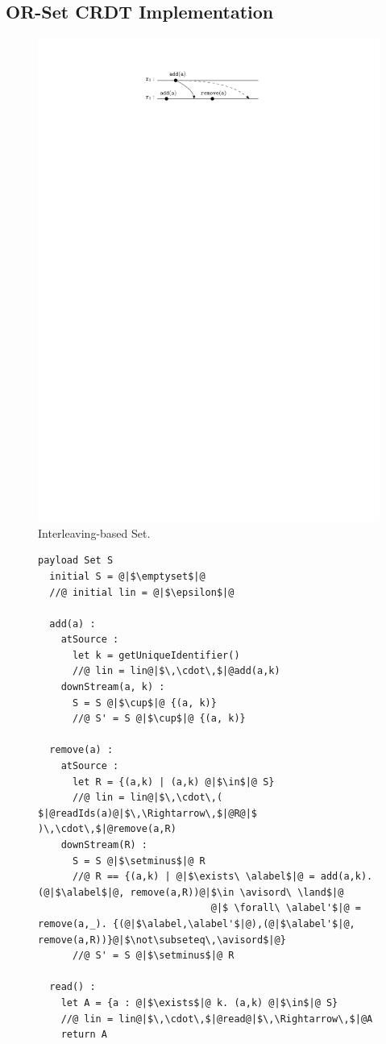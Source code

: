 

\subsection{OR-Set CRDT Implementation}
\label{sec:or-set-crdt}
\begin{figure}
  \centering
  \includegraphics[width=0.35 \textwidth]{./figures/OR-Set-simple}
  \vspace{-5pt}
  \caption{Interleaving-based Set.}
  \vspace{-5pt}
  \label{fig:or-set-simple}
\end{figure}

\begin{figure}[!t]
  \centering
\begin{lstlisting}[caption={Pseudo-code of the OR-Set CRDT.},basicstyle=\ttfamily\scriptsize,captionpos=b,label={lst:or-set}]
  payload Set S
  initial S = @|$\emptyset$|@
  //@ initial lin = @|$\epsilon$|@

  add(a) :
    atSource :
      let k = getUniqueIdentifier()
      //@ lin = lin@|$\,\cdot\,$|@add(a,k)
    downStream(a, k) :
      S = S @|$\cup$|@ {(a, k)}
      //@ S' = S @|$\cup$|@ {(a, k)}

  remove(a) :
    atSource :
      let R = {(a,k) | (a,k) @|$\in$|@ S}
      //@ lin = lin@|$\,\cdot\,( $|@readIds(a)@|$\,\Rightarrow\,$|@R@|$ )\,\cdot\,$|@remove(a,R)
    downStream(R) :
      S = S @|$\setminus$|@ R
      //@ R == {(a,k) | @|$\exists\ \alabel$|@ = add(a,k). (@|$\alabel$|@, remove(a,R))@|$\in \avisord\ \land$|@
                              @|$ \forall\ \alabel'$|@ = remove(a,_). {(@|$\alabel,\alabel'$|@),(@|$\alabel'$|@, remove(a,R))}@|$\not\subseteq\,\avisord$|@}
      //@ S' = S @|$\setminus$|@ R

  read() :
    let A = {a : @|$\exists$|@ k. (a,k) @|$\in$|@ S}
    //@ lin = lin@|$\,\cdot\,$|@read@|$\,\Rightarrow\,$|@A
    return A
\end{lstlisting}
\end{figure}

